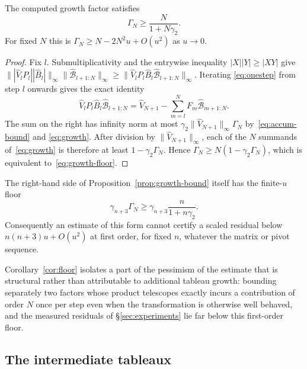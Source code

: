 \documentclass[review,onefignum,onetabnum]{siamart251216}
\begin{document}
\begin{proposition}\label{prop:growth-floor}
The computed growth factor satisfies
%
\begin{equation}\label{eq:growth-floor}
\Gamma_N \ge \frac{N}{1+N\gamma_2}.
\end{equation}
%
For fixed $N$ this is $\Gamma_N\ge N-2N^2u+O(u^2)$ as $u\to0$.
\end{proposition}

\begin{proof}
Fix $l$. Submultiplicativity and the entrywise inequality $|X||Y|\ge|XY|$ give
$\||\widehat V_lP_l||\widehat B_l|\|_\infty\|\widehat{\mathcal{B}}_{l+1:N}\|_\infty
\ge\|\widehat V_lP_l\widehat B_l\widehat{\mathcal{B}}_{l+1:N}\|_\infty$. Iterating
\eqref{eq:onestep} from step $l$ onwards gives the exact identity
%
\[
\widehat V_lP_l\widehat B_l\widehat{\mathcal B}_{l+1:N}
=
\widehat V_{N+1}-\sum_{m=l}^{N}F_m\widehat{\mathcal B}_{m+1:N}.
\]
%
The sum on the right has infinity norm at most
$\gamma_2\|\widehat V_{N+1}\|_\infty\Gamma_N$ by~\eqref{eq:accum-bound} and
\eqref{eq:growth}. After division by $\|\widehat V_{N+1}\|_\infty$, each of the $N$ summands
of~\eqref{eq:growth} is therefore at least $1-\gamma_2\Gamma_N$. Hence
$\Gamma_N\ge N(1-\gamma_2\Gamma_N)$, which is equivalent to~\eqref{eq:growth-floor}.
\end{proof}

\begin{corollary}\label{cor:floor}
The right-hand side of Proposition~\textup{\ref{prop:growth-bound}} itself has the finite-$u$
floor
%
\[
\gamma_{n+3}\Gamma_N
\ge
\gamma_{n+3}\frac{n}{1+n\gamma_2}.
\]
%
Consequently an estimate of this form cannot certify a scaled residual below
$n(n+3)u+O(u^2)$ at first order, for fixed $n$, whatever the matrix or pivot sequence.
\end{corollary}

Corollary~\ref{cor:floor} isolates a part of the pessimism of the estimate that is structural
rather than attributable to additional tableau growth: bounding separately two factors whose
product telescopes exactly incurs a contribution of order $N$ once per step even when the
transformation is otherwise well behaved, and the measured residuals of \S\ref{sec:experiments}
lie far below this first-order floor.

\subsection{The intermediate tableaux}
\label{sec:tableaux}
\end{document}
